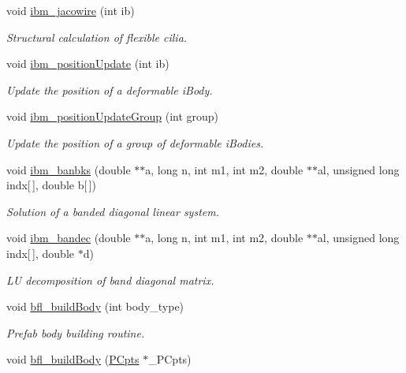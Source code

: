 \begin{DoxyCompactItemize}
void \hyperlink{class_object_manager_a956c12cba071c6b8844371c03433f82c}{ibm\+\_\+jacowire} (int ib)
\begin{DoxyCompactList}\small\item\em Structural calculation of flexible cilia. \end{DoxyCompactList}\item 
void \hyperlink{class_object_manager_a8315e05afcfbfd1bac21d3d53391bd4e}{ibm\+\_\+position\+Update} (int ib)
\begin{DoxyCompactList}\small\item\em Update the position of a deformable i\+Body. \end{DoxyCompactList}\item 
void \hyperlink{class_object_manager_a4108e20548dc7b2b4a3852dd33e6a2d1}{ibm\+\_\+position\+Update\+Group} (int group)
\begin{DoxyCompactList}\small\item\em Update the position of a group of deformable i\+Bodies. \end{DoxyCompactList}\item 
void \hyperlink{class_object_manager_a7bf970976700f9949bb08d8dc7f8e637}{ibm\+\_\+banbks} (double $\ast$$\ast$a, long n, int m1, int m2, double $\ast$$\ast$al, unsigned long indx\mbox{[}$\,$\mbox{]}, double b\mbox{[}$\,$\mbox{]})
\begin{DoxyCompactList}\small\item\em Solution of a banded diagonal linear system. \end{DoxyCompactList}\item 
void \hyperlink{class_object_manager_a77eb5ec758b5956e0a609fa1fba2f8e8}{ibm\+\_\+bandec} (double $\ast$$\ast$a, long n, int m1, int m2, double $\ast$$\ast$al, unsigned long indx\mbox{[}$\,$\mbox{]}, double $\ast$d)
\begin{DoxyCompactList}\small\item\em LU decomposition of band diagonal matrix. \end{DoxyCompactList}\item 
void \hyperlink{class_object_manager_ab14652a66537fba9f49a68d6e11605e0}{bfl\+\_\+build\+Body} (int body\+\_\+type)
\begin{DoxyCompactList}\small\item\em Prefab body building routine. \end{DoxyCompactList}\item 
void \hyperlink{class_object_manager_a8cd5fa724cbd50bcd00b940e5ae4a687}{bfl\+\_\+build\+Body} (\hyperlink{class_p_cpts}{P\+Cpts} $\ast$\+\_\+\+P\+Cpts)

\end{DoxyCompactItemize}
